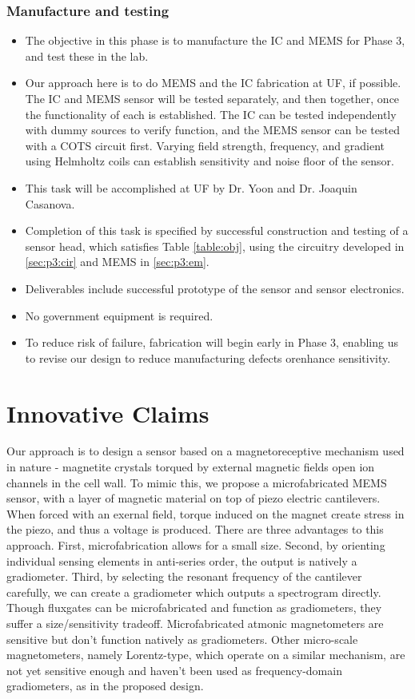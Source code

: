 \subsubsection{Manufacture and testing}\label{sec:p3:test}
\begin{itemize}
\item The objective in this phase is to manufacture the IC and MEMS for Phase 3, and test these in the lab.
\item Our approach here is to do MEMS and the IC fabrication at UF, if possible. The IC and MEMS sensor will be tested separately, and then together, once the functionality of each is established. The IC can be tested independently with dummy sources to verify function, and the MEMS sensor can be tested with a COTS circuit first. Varying field strength, frequency, and gradient using Helmholtz coils can establish sensitivity and noise floor of the sensor.
\item This task will be accomplished at UF by Dr. Yoon and Dr. Joaquin Casanova.
\item Completion of this task is specified by successful construction and testing of a sensor head, which satisfies Table \ref{table:obj}, using the circuitry developed in \ref{sec:p3:cir} and MEMS in \ref{sec:p3:em}.
\item Deliverables include successful prototype of the sensor and sensor electronics.
\item No government equipment is required.
\item To reduce risk of failure, fabrication will begin early in Phase 3, enabling us to revise our design to reduce manufacturing defects orenhance sensitivity.
\end{itemize}

\section{Innovative Claims}\label{sec:inno}

Our approach is to design a sensor based on a magnetoreceptive mechanism used in nature - magnetite crystals torqued by external magnetic fields open ion channels in the cell wall. To mimic this, we propose a microfabricated MEMS sensor, with a layer of magnetic material on top of piezo electric cantilevers. When forced with an exernal field, torque induced on the magnet create stress in the piezo, and thus a voltage is produced. There are three advantages to this approach. First, microfabrication allows for a small size. Second, by orienting individual sensing elements in anti-series order, the output is natively a gradiometer. Third, by selecting the resonant frequency of the cantilever carefully, we can create a gradiometer which outputs a spectrogram directly. Though fluxgates can be microfabricated and function as gradiometers, they suffer a size/sensitivity tradeoff. Microfabricated atmonic magnetometers are sensitive but don't function natively as gradiometers. Other micro-scale magnetometers, namely Lorentz-type, which operate on a similar mechanism, are not yet sensitive enough and haven't been used as frequency-domain gradiometers, as in the proposed design.

